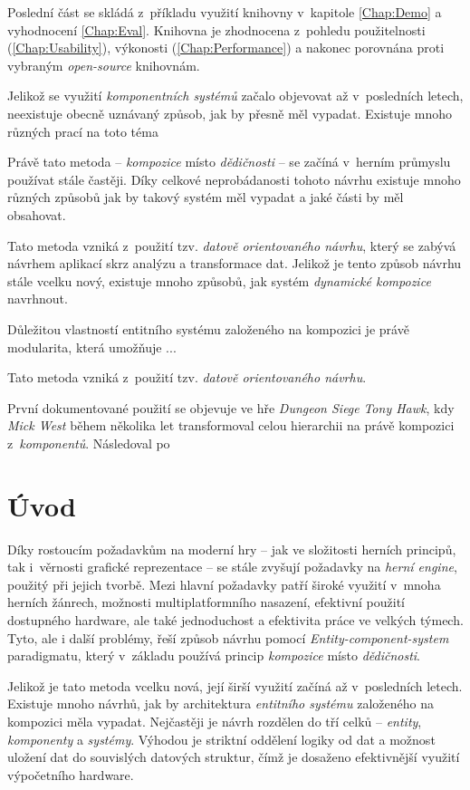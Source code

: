 Poslední část se skládá z~příkladu využití knihovny v~kapitole \ref{Chap:Demo} a vyhodnocení \ref{Chap:Eval}. Knihovna je zhodnocena z~pohledu použitelnosti (\ref{Chap:Usability}), výkonosti (\ref{Chap:Performance}) a nakonec porovnána proti vybraným \emph{open-source} knihovnám.

Jelikož se využití \emph{komponentních systémů} začalo objevovat až v~posledních letech, neexistuje obecně uznávaný způsob, jak by přesně měl vypadat. Existuje mnoho různých prací na toto téma

Právě tato metoda -- \emph{kompozice} místo \emph{dědičnosti} -- se začíná v~herním průmyslu používat stále častěji. Díky celkové neprobádanosti tohoto návrhu existuje mnoho různých způsobů jak by takový systém měl vypadat a jaké části by měl obsahovat.

Tato metoda vzniká z~použití tzv. \emph{datově orientovaného návrhu}\cite{DOD}, který se zabývá návrhem aplikací skrz analýzu a transformace dat. Jelikož je tento způsob návrhu stále vcelku nový, existuje mnoho způsobů, jak systém \emph{dynamické kompozice} navrhnout. 

Důležitou vlastností entitního systému založeného na kompozici je právě modularita, která umožňuje ...

Tato metoda vzniká z~použití tzv. \emph{datově orientovaného návrhu}\cite{DOD}.

První dokumentované použití se objevuje ve hře \emph{Dungeon Siege}\cite{DungeonSiege} \emph{Tony Hawk}, kdy \emph{Mick West} během několika let transformoval celou hierarchii na právě kompozici z~\emph{komponentů}. Následoval po

\fi

\chapter{Úvod}

Díky rostoucím požadavkům na moderní hry -- jak ve složitosti herních principů, tak i~věrnosti grafické reprezentace -- se stále zvyšují požadavky na \emph{herní engine}, použitý při jejich tvorbě. Mezi hlavní požadavky patří široké využití v~mnoha herních žánrech, možnosti multiplatformního nasazení, efektivní použití dostupného hardware, ale také jednoduchost a efektivita práce ve velkých týmech. Tyto, ale i další problémy, řeší způsob návrhu pomocí \emph{Entity-component-system} paradigmatu, který v~základu používá princip \emph{kompozice} místo \emph{dědičnosti}.

Jelikož je tato metoda vcelku nová, její širší využití začíná až v~posledních letech. Existuje mnoho návrhů, jak by architektura \emph{entitního systému} založeného na kompozici měla vypadat. Nejčastěji je návrh rozdělen do tří celků -- \emph{entity}, \emph{komponenty} a \emph{systémy}. Výhodou je striktní oddělení logiky od dat a možnost uložení dat do souvislých datových struktur, čímž je dosaženo efektivnější využití výpočetního hardware.

